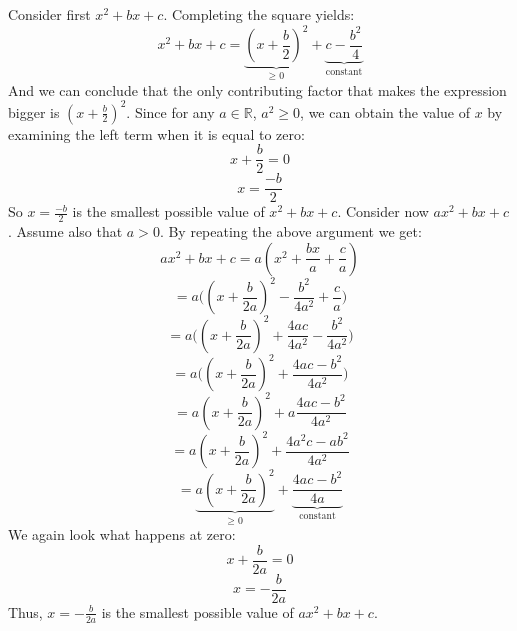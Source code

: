 \documentclass{article}
\begin{document}
Consider first \(x^{2} + bx + c\). Completing the square yields:
\begin{equation*}
	x^{2} + bx + c = \underbrace{(x + \frac{b}{2})^{2}}_\text{\(\geq\) 0} + \underbrace{c - \frac{b^{2}}{4}}_\text{constant}
\end{equation*}
And we can conclude that the only contributing factor that makes the expression bigger 
is \((x + \frac{b}{2})^{2}\). Since for any \(a \in \mathbb{R}\), \(a^{2} \geq 0\), we can obtain
the value of \(x\) by examining the left term when it is equal to zero:
\begin{equation*}
	x + \frac{b}{2} = 0
\end{equation*}
\begin{equation*}
	x = \frac{-b}{2}
\end{equation*}
So \(x = \frac{-b}{2}\) is the smallest possible value of \(x^{2} + bx + c\).
Consider now \(ax^{2} + bx + c\). Assume also that \(a > 0\). By repeating the above argument we get:
\begin{equation*}
	ax^{2} + bx + c = a(x^{2} + \frac{bx}{a} + \frac{c}{a})
\end{equation*}
\begin{equation*}
	= a\Bigg((x + \frac{b}{2a})^{2} - \frac{b^{2}}{4a^{2}} + \frac{c}{a}\Bigg)
\end{equation*}
\begin{equation*}
	= a\Bigg((x + \frac{b}{2a})^{2} + \frac{4ac}{4a^{2}} - \frac{b^{2}}{4a^{2}}\Bigg)
\end{equation*}
\begin{equation*}
	= a\Bigg((x + \frac{b}{2a})^{2} + \frac{4ac - b^{2}}{4a^{2}}\Bigg)
\end{equation*}
\begin{equation*}
	= a(x + \frac{b}{2a})^{2} + a \frac{4ac - b^{2}}{4a^{2}}
\end{equation*}
\begin{equation*}
	= a(x + \frac{b}{2a})^{2} + \frac{4a^{2}c - ab^{2}}{4a^{2}}
\end{equation*}
\begin{equation*}
	= \underbrace{a(x + \frac{b}{2a})^{2}}_\text{\(\geq\) 0} + \underbrace{\frac{4ac - b^{2}}{4a}}_\text{constant}
\end{equation*}
We again look what happens at zero:
\begin{equation*}
	x + \frac{b}{2a} = 0
\end{equation*}
\begin{equation*}
	x = - \frac{b}{2a}
\end{equation*}
Thus, \(x = - \frac{b}{2a}\) is the smallest possible value of \(ax^{2} + bx + c\).
\end{document}
